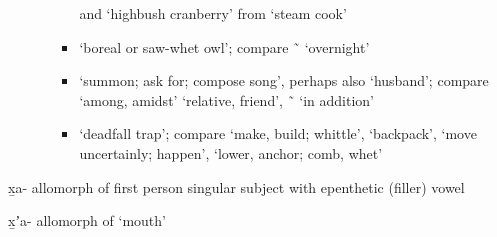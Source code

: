 \begin{morphdesc}[resume*=alphalist]
\begin{enumerate}
\begin{enumerate}
\begin{itemize}
				and  ‘highbush cranberry’
				from  ‘steam cook’
			\item	{} ‘boreal or saw-whet owl’;
				compare  \~\  ‘overnight’
			\item	{} ‘summon; ask for; compose song’,
				perhaps also  ‘husband’;
				compare  ‘among, amidst’
				 ‘relative, friend’,
				 \~\  ‘in addition’
			\item	{} ‘deadfall trap’;
				compare  ‘make, build; whittle’,
				 ‘backpack’,
				 ‘move uncertainly; happen’,
				 ‘lower, anchor; comb, whet’
			\end{itemize}
		\end{enumerate}
	\end{enumerate}

\item[x̱a-]\label{m:x̱a-}
	allomorph of first person singular subject  with epenthetic (filler) vowel

\item[x̱ʼa-]\label{m:x̱ʼa-}
	allomorph of  ‘mouth’


\end{morphdesc}
